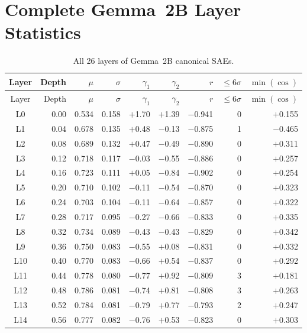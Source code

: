 \documentclass[11pt,a4paper]{article}
\begin{document}
\newpage
\appendix

\section{Complete Gemma~2B Layer Statistics}
\label{app:gemma_full}

\begin{longtable}{@{}crrrrrrrr@{}}
\caption{All 26 layers of Gemma~2B canonical SAEs.}\label{tab:gemma_full}\\
\toprule
Layer & Depth & $\mu$ & $\sigma$ & $\gamma_1$ & $\gamma_2$ & $r$ & ${\leq}6\sigma$ & $\min(\cos)$ \\
\midrule
\endfirsthead
\toprule
Layer & Depth & $\mu$ & $\sigma$ & $\gamma_1$ & $\gamma_2$ & $r$ & ${\leq}6\sigma$ & $\min(\cos)$ \\
\midrule
\endhead
\bottomrule
\endfoot
L0  & 0.00 & 0.534 & 0.158 & $+$1.70 & $+$1.39 & $-$0.941 & 0 & $+$0.155 \\
L1  & 0.04 & 0.678 & 0.135 & $+$0.48 & $-$0.13 & $-$0.875 & 1 & $-$0.465 \\
L2  & 0.08 & 0.689 & 0.132 & $+$0.47 & $-$0.49 & $-$0.890 & 0 & $+$0.311 \\
L3  & 0.12 & 0.718 & 0.117 & $-$0.03 & $-$0.55 & $-$0.886 & 0 & $+$0.257 \\
L4  & 0.16 & 0.723 & 0.111 & $+$0.05 & $-$0.84 & $-$0.902 & 0 & $+$0.254 \\
L5  & 0.20 & 0.710 & 0.102 & $-$0.11 & $-$0.54 & $-$0.870 & 0 & $+$0.323 \\
L6  & 0.24 & 0.703 & 0.104 & $-$0.11 & $-$0.64 & $-$0.857 & 0 & $+$0.322 \\
L7  & 0.28 & 0.717 & 0.095 & $-$0.27 & $-$0.66 & $-$0.833 & 0 & $+$0.335 \\
L8  & 0.32 & 0.734 & 0.089 & $-$0.43 & $-$0.43 & $-$0.829 & 0 & $+$0.342 \\
L9  & 0.36 & 0.750 & 0.083 & $-$0.55 & $+$0.08 & $-$0.831 & 0 & $+$0.332 \\
L10 & 0.40 & 0.770 & 0.083 & $-$0.66 & $+$0.54 & $-$0.837 & 0 & $+$0.292 \\
L11 & 0.44 & 0.778 & 0.080 & $-$0.77 & $+$0.92 & $-$0.809 & 3 & $+$0.181 \\
L12 & 0.48 & 0.786 & 0.081 & $-$0.74 & $+$0.81 & $-$0.808 & 3 & $+$0.263 \\
L13 & 0.52 & 0.784 & 0.081 & $-$0.79 & $+$0.77 & $-$0.793 & 2 & $+$0.247 \\
L14 & 0.56 & 0.777 & 0.082 & $-$0.76 & $+$0.53 & $-$0.823 & 0 & $+$0.303 \\

\end{longtable}
\end{document}
